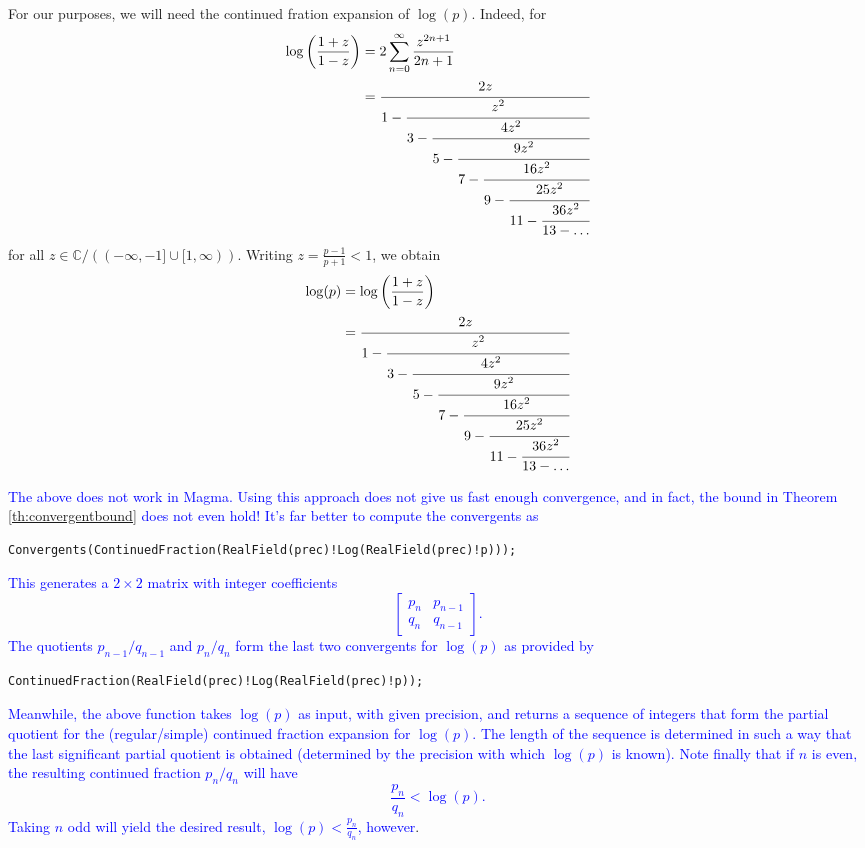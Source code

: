 \documentclass[11pt]{report}
\theoremstyle{definition}
\newcommand{\edit}[1]{\textcolor{blue}{#1}}
\begin{document}
For our purposes, we will need the continued fration expansion of $\log(p)$. Indeed, for
\begin{align*}
  \log\left(\frac{1+z}{1-z}\right)
  & = 2\sum_{n=0}^{\infty}\frac{z^{2n+1}}{2n+1} \\
  & = \cfrac{2z}{1-\cfrac{z^2}{3 - \cfrac{4z^2}{5-\cfrac{9z^2}{7-\cfrac{16z^2}{9 - \cfrac{25z^2}{11 - \cfrac{36z^2}{13 - \dots}}}}}}}
\end{align*}
for all $z \in \mathbb{C}/((-\infty,-1] \cup [1,\infty))$. Writing $z = \frac{p-1}{p+1}<1$, we obtain
\begin{align*}
  \log(p) & = \log\left(\frac{1+z}{1-z}\right)\\
          & = \cfrac{2z}{1-\cfrac{z^2}{3 - \cfrac{4z^2}{5-\cfrac{9z^2}{7-\cfrac{16z^2}{9 - \cfrac{25z^2}{11 - \cfrac{36z^2}{13 - \dots}}}}}}}
\end{align*}

\edit{The above does not work in Magma. Using this approach does not give us fast enough convergence, and in fact, the bound in Theorem \ref{th:convergentbound} does not even hold! It's far better to compute the convergents as}
\begin{lstlisting}
Convergents(ContinuedFraction(RealField(prec)!Log(RealField(prec)!p)));
\end{lstlisting}
\edit{This generates a $2 \times 2$ matrix with integer coefficients
  \[  \begin{bmatrix}
      p_n & p_{n-1} \\
      q_n & q_{n-1}
    \end{bmatrix}.
  \]
  The quotients $p_{n-1}/q_{n-1}$ and $p_n/q_n$ form the last two convergents for $\log(p)$ as provided by}
\begin{lstlisting}
ContinuedFraction(RealField(prec)!Log(RealField(prec)!p));
\end{lstlisting}
\edit{Meanwhile, the above function takes $\log(p)$ as input, with given precision, and returns a sequence of integers that form the partial quotient for the (regular/simple) continued fraction expansion for $\log(p)$. The length of the sequence is determined in such a way that the last significant partial quotient is obtained (determined by the precision with which $\log(p)$ is known). Note finally that if $n$ is even, the resulting continued fraction $p_n/q_n$ will have
\[\frac{p_n}{q_n} < \log(p).\]
Taking $n$ odd will yield the desired result, $\log(p) < \frac{p_n}{q_n}$, however}.

\end{document}
